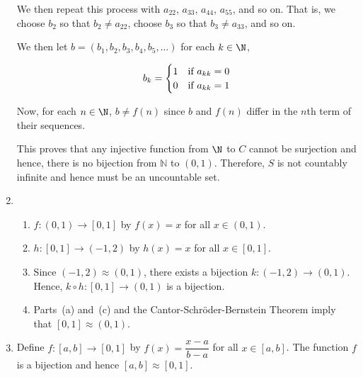 \begin{enumerate}
We then repeat this process with $a_{2 2}$, $a_{3 3}$, 
$a_{4 4}$, $a_{5 5}$, and so on.  That is, we choose $b_2$ so that $b_2 \ne a_{2 2}$, 
choose $b_3$ so that $b_3 \ne a_{3 3}$, and so on.

We then let $b = \left(b_1, b_2, b_3, b_4, b_5, \ldots \right)$  for each $k \in \N$,

\begin{equation} \notag
b_k = 
\begin{cases}
1         &\text{if $a_{k k} = 0$} \\
0         &\text{if $a_{k k} = 1$}
\end{cases}
\end{equation}

Now, for each $n \in \N$, $b \ne f \left( n \right)$ since $b$ and $f \left( n \right)$ differ in the $n${th} term of their sequences.

This proves that any injective function from $\N$ to $C$ cannot be surjection and hence, there is no bijection from $\mathbb{N}$ to $\left( 0, 1 \right)$.  Therefore, 
$S$ is not countably infinite and hence must be an uncountable set.

\item \begin{enumerate}
\item $f: \left( 0, 1 \right) \to \left[ 0, 1 \right]$ by $f \left( x \right) = x$ for all 
$x \in \left( 0, 1 \right)$.

\item $h: \left[ 0, 1 \right] \to \left( -1, 2 \right)$ by $h \left( x \right) = x$ for all 
$x \in \left[ 0, 1 \right]$.

\item Since $\left( -1, 2 \right) \approx \left( 0, 1 \right)$, there exists a bijection 
$k: \left( -1, 2 \right) \to \left( 0, 1 \right)$.  Hence, 
$k \circ h : \left[0, 1 \right] \to  \left( 0, 1 \right)$ is a bijection.

\item Parts~(a) and~(c) and the Cantor-Schr\"{o}der-Bernstein Theorem imply that 
$\left[0, 1 \right] \approx \left( 0, 1 \right)$.
\end{enumerate}

\item Define $f: \left[ a, b \right] \to \left[ 0, 1 \right]$ by 
$f \left( x \right) = \dfrac{x - a}{b - a}$ for all $x \in \left[ a, b \right]$.  The function 
$f$ is a bijection and hence $\left[ a, b \right] \approx \left[ 0, 1 \right]$.



\end{enumerate}
